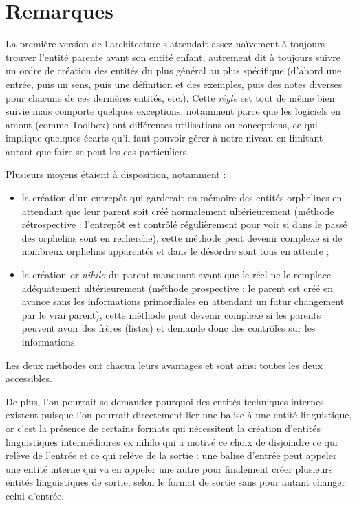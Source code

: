 \documentclass[10pt]{report}
\newcommand{\balise}[1]{\textcolor{red!80}{#1}}
\newcommand{\entité}[1]{\textcolor{blue!60!black}{#1}}
\newcommand{\entitétechnique}[1]{\textcolor{blue!50!red}{#1}}
\begin{document}
\section{Remarques}

La première version de l’architecture s’attendait assez naïvement à toujours trouver l’entité parente avant son entité enfant, autrement dit à toujours suivre un ordre de création des entités du plus général au plus spécifique (d’abord une entrée, puis un sens, puis une définition et des exemples, puis des notes diverses pour chacune de ces dernières entités, etc.). Cette \textit{règle} est tout de même bien suivie mais comporte quelques exceptions, notamment parce que les logiciels en amont (comme Toolbox) ont différentes utilisations ou conceptions, ce qui implique quelques écarts qu’il faut pouvoir gérer à notre niveau en limitant autant que faire se peut les cas particuliers.

\bigskip

Plusieurs moyens étaient à disposition, notamment :
\begin{itemize}
	\item la création d’un entrepôt qui garderait en mémoire des entités orphelines en attendant que leur parent soit créé normalement ultérieurement (méthode rétrospective : l’entrepôt est contrôlé régulièrement pour voir si dans le passé des orphelins sont en recherche), cette méthode peut devenir complexe si de nombreux orphelins apparentés et dans le désordre sont tous en attente ;
	\item la création \textit{ex nihilo} du parent manquant avant que le réel ne le remplace adéquatement ultérieurement (méthode prospective : le parent est créé en avance sans les informations primordiales en attendant un futur changement par le vrai parent), cette méthode peut devenir complexe si les parents peuvent avoir des frères (listes) et demande donc des contrôles sur les informations.
\end{itemize} 

Les deux méthodes ont chacun leurs avantages et sont ainsi toutes les deux accessibles. 

\bigskip

De plus, l’on pourrait se demander pourquoi des \entitétechnique{entités techniques internes} existent puisque l’on pourrait directement lier une \balise{balise} à une \entité{entité linguistique}, or c’est la présence de certains formats qui nécessitent la création d’\entité{entités linguistiques intermédiaires} ex nihilo qui a motivé ce choix de disjoindre ce qui relève de l’entrée et ce qui relève de la sortie : une \balise{balise} d’entrée peut appeler une \entitétechnique{entité interne} qui va en appeler une \entitétechnique{autre} pour finalement créer plusieurs \entité{entités linguistiques} de sortie, selon le format de sortie sans pour autant changer celui d’entrée.
\end{document}
